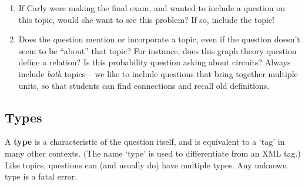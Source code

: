     \begin{enumerate}[1.]\itemsep0pt
      \item If Carly were making the final exam, and wanted to include a question on this topic, would she want to see this problem? If so, include the topic!
      \item Does the question mention or incorporate a topic, even if the question doesn't seem to be ``about'' that topic? For instance, does this graph theory question define a relation? Is this probability question asking about circuits? Always include \textit{both} topics -- we like to include questions that bring together multiple units, so that students can find connections and recall old definitions.
    \end{enumerate}
  
  \subsection{Types}
    A \textbf{type} is a characteristic of the question itself, and is equivalent to a `tag' in many other contexts. (The name `type' is used to differentiate from an XML tag.) Like topics, questions can (and usually do) have multiple types. Any unknown type is a fatal error.
    
